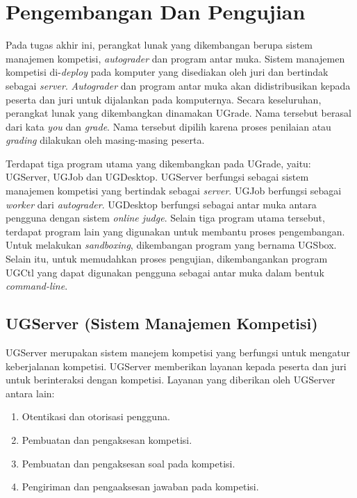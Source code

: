 \chapter{Pengembangan Dan Pengujian}

\par Pada tugas akhir ini, perangkat lunak yang dikembangan berupa sistem manajemen kompetisi, \textit{autograder} dan program antar muka.  Sistem manajemen kompetisi di-\textit{deploy} pada komputer yang disediakan oleh juri dan bertindak sebagai \textit{server}. \textit{Autograder} dan program antar muka akan didistribusikan kepada peserta dan juri untuk dijalankan pada komputernya. Secara keseluruhan, perangkat lunak yang dikembangkan dinamakan UGrade. Nama tersebut berasal dari kata \textit{you} dan \textit{grade}. Nama tersebut dipilih karena proses penilaian atau \textit{grading} dilakukan oleh masing-masing peserta.

\par Terdapat tiga program utama yang dikembangkan pada UGrade, yaitu: UGServer, UGJob dan UGDesktop. UGServer berfungsi sebagai sistem manajemen kompetisi yang bertindak sebagai \textit{server}. UGJob berfungsi sebagai \textit{worker} dari \textit{autograder}. UGDesktop berfungsi sebagai antar muka antara pengguna dengan sistem \textit{online judge}. Selain tiga program utama tersebut, terdapat program lain yang digunakan untuk membantu proses pengembangan. Untuk melakukan \textit{sandboxing}, dikembangan program yang bernama UGSbox. Selain itu, untuk memudahkan proses pengujian, dikembangankan program UGCtl yang dapat digunakan pengguna sebagai antar muka dalam bentuk \textit{command-line}.

\section{UGServer (Sistem Manajemen Kompetisi)}

\par UGServer merupakan sistem manejem kompetisi yang berfungsi untuk mengatur keberjalanan kompetisi. UGServer memberikan layanan kepada peserta dan juri untuk berinteraksi dengan kompetisi. Layanan yang diberikan oleh UGServer antara lain:
\begin{enumerate}
  \item Otentikasi dan otorisasi pengguna.
  \item Pembuatan dan pengaksesan kompetisi.
  \item Pembuatan dan pengaksesan soal pada kompetisi.
  \item Pengiriman dan pengaaksesan jawaban pada kompetisi.
\end{enumerate}

